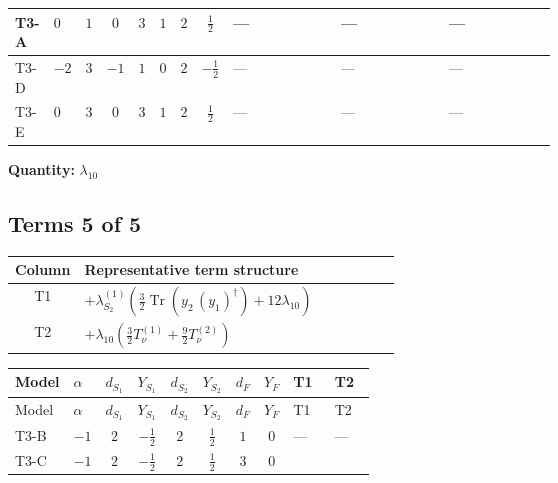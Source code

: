 \documentclass[8pt]{article}
\begin{document}
\begin{landscape}
\begin{longtable}{@{}llcccccc >{\raggedright\arraybackslash}p{0.21\linewidth} >{\raggedright\arraybackslash}p{0.21\linewidth} >{\raggedright\arraybackslash}p{0.21\linewidth}@{}}
\midrule
T3-A & $0$ & $1$ & $0$ & $3$ & $1$ & $2$ & $\frac{1}{2}$ & --- & --- & --- \\
\midrule
T3-D & $-2$ & $3$ & $-1$ & $1$ & $0$ & $2$ & $-\frac{1}{2}$ & --- & --- & --- \\
\midrule
T3-E & $0$ & $3$ & $0$ & $3$ & $1$ & $2$ & $\frac{1}{2}$ & --- & --- & --- \\
\midrule
\bottomrule
\end{longtable}
\clearpage
\noindent\textbf{Quantity: }$\lambda_{10}$\par\smallskip
\subsection*{Terms 5 of 5}
\begin{center}
\begin{tabular}{@{}c >{\raggedright\arraybackslash}p{0.82\linewidth}@{}}
\toprule
Column & Representative term structure \\
\midrule
T1 & \(\displaystyle +{\lambda_{S_2}^{(1)}} \left(\frac{3}{2} \operatorname{Tr}\!\left({y_2}\,\left({y_1}\right)^{\dagger}\right)+12 {\lambda_{10}}\right)\) \\
\midrule
T2 & \(\displaystyle +{\lambda_{10}} \left(\frac{3}{2} T_{\nu}^{(1)}+\frac{9}{2} T_{\nu}^{(2)}\right)\) \\
\midrule
\bottomrule
\end{tabular}
\end{center}
\smallskip
\tiny
\begin{longtable}{@{}llcccccc >{\raggedright\arraybackslash}p{0.21\linewidth} >{\raggedright\arraybackslash}p{0.21\linewidth}@{}}
\toprule
Model & $\alpha$ & $d_{S_1}$ & $Y_{S_1}$ & $d_{S_2}$ & $Y_{S_2}$ & $d_F$ & $Y_F$ & T1 & T2 \\
\midrule
\endfirsthead
\toprule
Model & $\alpha$ & $d_{S_1}$ & $Y_{S_1}$ & $d_{S_2}$ & $Y_{S_2}$ & $d_F$ & $Y_F$ & T1 & T2 \\
\midrule
\endhead
T3-B & $-1$ & $2$ & $-\frac{1}{2}$ & $2$ & $\frac{1}{2}$ & $1$ & $0$ & --- & --- \\
\midrule
T3-C & $-1$ & $2$ & $-\frac{1}{2}$ & $2$ & $\frac{1}{2}$ & $3$ & $0$ & \scriptsize\adjustbox{max width=\linewidth}{$\begin{gathered} +{\lambda_{S_2}^{(1)}} \left(\frac{3}{2} \operatorname{Tr}\!\left({y_2}\,\left({y_1}\right)^{\dagger}\right)+12 {\lambda_{10}}\right)\end{gathered}$} & \scriptsize\adjustbox{max width=\linewidth}{$\begin{gathered} +{\lambda_{10}} \left(\frac{3}{2} T_{\nu}^{(1)}+\frac{9}{2} T_{\nu}^{(2)}\right)\end{gathered}$} \\

\end{longtable}
\end{landscape}
\end{document}
